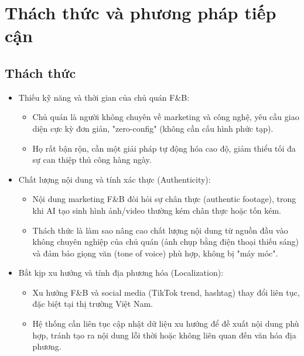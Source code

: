 \section{Thách thức và phương pháp tiếp
cận}\label{thuxe1ch-thux1ee9c-vuxe0-phux1b0ux1a1ng-phuxe1p-tiux1ebfp-cux1eadn}

\subsection{Thách thức}\label{thuxe1ch-thux1ee9c}

\begin{itemize}
\item
  Thiếu kỹ năng và thời gian của chủ quán F\&B:

  \begin{itemize}
  \item
    Chủ quán là người không chuyên về marketing và công nghệ, yêu cầu
    giao diện cực kỳ đơn giản, "zero-config" (không cần cấu hình phức
    tạp).
  \item
    Họ rất bận rộn, cần một giải pháp tự động hóa cao độ, giảm thiểu tối
    đa sự can thiệp thủ công hàng ngày.
  \end{itemize}
\item
  Chất lượng nội dung và tính xác thực (Authenticity):

  \begin{itemize}
  \item
    Nội dung marketing F\&B đòi hỏi sự chân thực (authentic footage),
    trong khi AI tạo sinh hình ảnh/video thường kém chân thực hoặc tốn
    kém.
  \item
    Thách thức là làm sao nâng cao chất lượng nội dung từ nguồn đầu vào
    không chuyên nghiệp của chủ quán (ảnh chụp bằng điện thoại thiếu
    sáng) và đảm bảo giọng văn (tone of voice) phù hợp, không bị "máy
    móc".
  \end{itemize}
\item
  Bắt kịp xu hướng và tính địa phương hóa (Localization):

  \begin{itemize}
  \item
    Xu hướng F\&B và social media (TikTok trend, hashtag) thay đổi liên
    tục, đặc biệt tại thị trường Việt Nam.
  \item
    Hệ thống cần liên tục cập nhật dữ liệu xu hướng để đề xuất nội dung
    phù hợp, tránh tạo ra nội dung lỗi thời hoặc không liên quan đến văn
    hóa địa phương.
  \end{itemize}
\end{itemize}

